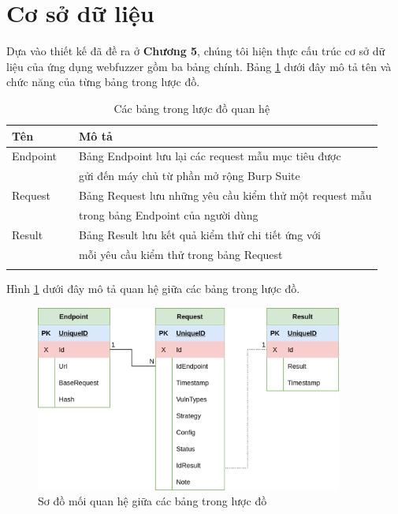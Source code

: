 \section{Cơ sở dữ liệu}
Dựa vào thiết kế đã đề ra ở \textbf{Chương 5}, chúng tôi hiện thực cấu trúc cơ sở dữ liệu của ứng dụng webfuzzer gồm ba bảng chính. Bảng \ref{tab:db-tables} dưới đây mô tả tên và chức năng của từng bảng trong lược đồ.
\begin{table}[ht]
    \centering
    \caption{Các bảng trong lược đồ quan hệ}
    \label{tab:db-tables}
    \begin{tabular}[ht]{lll}
        \toprule[1pt]\midrule[0.3pt]
            \textbf{Tên}& &\textbf{Mô tả}\\ 
        \midrule
            Endpoint& &Bảng Endpoint lưu lại các request mẫu mục tiêu được\\
            {}& &gửi đến máy chủ từ phần mở rộng Burp Suite\\
            \addlinespace
            Request& &Bảng Request lưu những yêu cầu kiểm thử một request mẫu \\
            {}& &trong bảng Endpoint của người dùng\\
            \addlinespace
            Result& &Bảng Result lưu kết quả kiểm thử chi tiết ứng với\\
            {}& &mỗi yêu cầu kiểm thử trong bảng Request\\
            \addlinespace
        \midrule[0.3pt]\bottomrule[1pt]
    \end{tabular}
\end{table}
\FloatBarrier
Hình \ref{fig:db-schema} dưới đây mô tả quan hệ giữa các bảng trong lược đồ.
\begin{figure}[H]
  \centering
    \includegraphics[width=0.9\textwidth,keepaspectratio=true]{images/database-design.png}
  \caption{Sơ đồ mối quan hệ giữa các bảng trong lược đồ}
  \label{fig:db-schema}
\end{figure}
